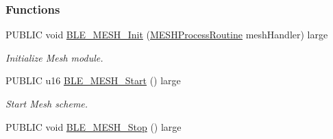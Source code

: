 \subsubsection*{Functions}
\begin{DoxyCompactItemize}
\item 
P\+U\+B\+L\+IC void \hyperlink{group___m_e_s_h_gaa4778cac2288723cda53693b176a64ea}{B\+L\+E\+\_\+\+M\+E\+S\+H\+\_\+\+Init} (\hyperlink{group___m_e_s_h_ga46ab9a569a5fb649c1c0246cb81b3389}{M\+E\+S\+H\+Process\+Routine} mesh\+Handler) large
\begin{DoxyCompactList}\small\item\em Initialize Mesh module. \end{DoxyCompactList}\item 
P\+U\+B\+L\+IC u16 \hyperlink{group___m_e_s_h_ga3af7a85eb552a1f32ac89a9b21c6fd50}{B\+L\+E\+\_\+\+M\+E\+S\+H\+\_\+\+Start} () large
\begin{DoxyCompactList}\small\item\em Start Mesh scheme. \end{DoxyCompactList}\item 
P\+U\+B\+L\+IC void \hyperlink{group___m_e_s_h_ga15c5398b4b0ae656d1f2f29168f5467f}{B\+L\+E\+\_\+\+M\+E\+S\+H\+\_\+\+Stop} () large\hypertarget{group___m_e_s_h_ga15c5398b4b0ae656d1f2f29168f5467f}{}\label{group___m_e_s_h_ga15c5398b4b0ae656d1f2f29168f5467f}


\end{DoxyCompactItemize}
